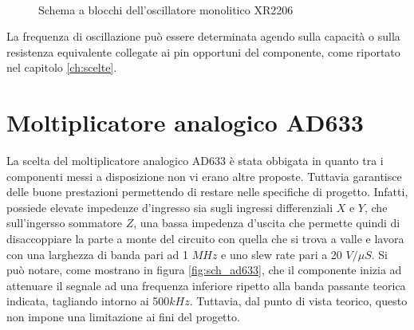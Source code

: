 \documentclass[titlepage]{report}
\begin{document}
	\begin{figure}[H]
		\centering
		 \qquad
		 \\
		\caption{Schema a blocchi dell'oscillatore monolitico XR2206}
		\label{fig:sch_xr2206}
	\end{figure}

	La frequenza di oscillazione può essere determinata agendo sulla capacità o sulla resistenza equivalente collegate ai pin opportuni del componente, come riportato nel capitolo \ref{ch:scelte}.
	
	
\section{Moltiplicatore analogico AD633}
	\label{sec:AD633}
	La scelta del moltiplicatore analogico AD633 è stata obbigata in quanto tra i componenti messi a disposizione non vi erano altre proposte.
	Tuttavia garantisce delle buone prestazioni permettendo di restare nelle specifiche di progetto.
	Infatti, possiede elevate impedenze d'ingresso sia sugli ingressi differenziali $X$ e $Y$, che sull'ingersso sommatore $Z$, una bassa impedenza d'uscita che permette quindi di disaccoppiare la parte a monte del circuito con quella che si trova a valle e lavora con una larghezza di banda pari ad 1 $MHz$ e uno slew rate pari a 20 $V/\mu S$. 
	Si può notare, come mostrano in figura \ref{fig:sch_ad633}, che il componente inizia ad attenuare il segnale ad una frequenza inferiore ripetto alla banda passante teorica indicata, tagliando intorno ai 500$kHz$.
	Tuttavia, dal punto di vista teorico, questo non impone una limitazione ai fini del progetto.
\end{document}
